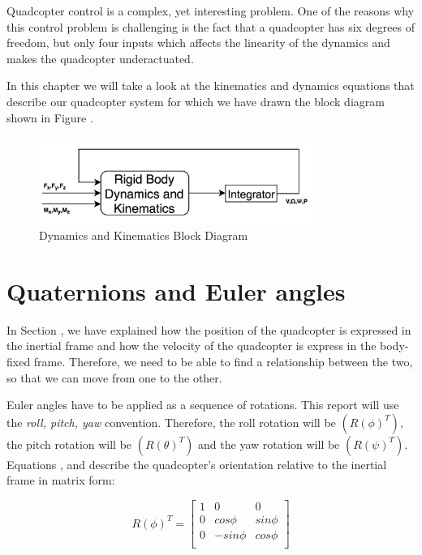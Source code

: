Quadcopter control is a complex, yet interesting problem. One of the reasons why this control problem is challenging is the fact that a quadcopter has six degrees of freedom, but only four inputs which affects the linearity of the dynamics and makes the quadcopter underactuated. 

In this chapter we will take a look at the kinematics and dynamics equations that describe our quadcopter system for which we have drawn the block diagram shown in Figure \label{dk} .

\begin{figure}[H]
  \centering
    \includegraphics[width=0.8\textwidth]{images/blockdiagram.png}
	\caption{Dynamics and Kinematics Block Diagram}
	\label{dk}
\end{figure}

\section{Quaternions and Euler angles}
In Section \label{2.1}, we have explained how the position of the quadcopter is expressed in the inertial frame and how the  velocity of the quadcopter is express in the body-fixed frame. Therefore, we need to be able to find a relationship between the two, so that we can move from one to the other.

Euler angles have to be applied as a sequence of rotations. This report will use the \textit{roll, pitch, yaw} convention. Therefore, the roll rotation will be $(R(\phi)^{T})$, the pitch rotation will be $(R(\theta)^{T})$ and the yaw rotation will be $(R(\psi)^{T})$. Equations \label{rollrotation}, \label{pitchrotation} and \label{yawrotation}  describe the quadcopter's orientation relative to the inertial frame in matrix form:

\begin{equation}
\label{rollrotation}	
 	R(\phi)^{T}=\begin{bmatrix}
 	1 & 0 & 0 \\
 	0 & cos\phi & sin\phi \\
 	0 & -sin\phi & cos\phi \\
 	\end{bmatrix}
 \end{equation}
 
